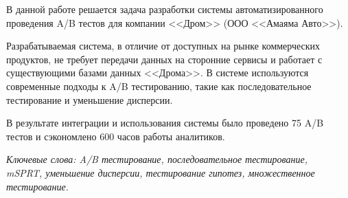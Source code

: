 \documentclass[../document.tex]{subfiles}
\begin{document}
	\par В данной работе решается задача разработки системы автоматизированного проведения A/B тестов для компании <<Дром>> (ООО <<Амаяма Авто>>).
	\par Разрабатываемая система, в отличие от доступных на рынке коммерческих продуктов, не требует передачи данных на сторонние сервисы и работает с существующими базами данных <<Дрома>>. В системе используются современные подходы к A/B тестированию, такие как последовательное тестирование и уменьшение дисперсии.
	\par В результате интеграции и использования системы было проведено 75 A/B тестов и сэкономлено 600 часов работы аналитиков.
	\par \textit{Ключевые слова: A/B тестирование, последовательное тестирование,\\ 
		mSPRT, уменьшение дисперсии, тестирование гипотез, множественное тестирование.}
\end{document}
